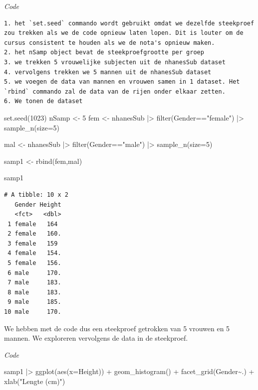 \documentclass[
  dutch,
  letterpaper,
  12pt]{book}
\newenvironment{Shaded}{\begin{snugshade}}{\end{snugshade}}
\newcommand{\AttributeTok}[1]{\textcolor[rgb]{0.40,0.45,0.13}{#1}}
\newcommand{\DecValTok}[1]{\textcolor[rgb]{0.68,0.00,0.00}{#1}}
\newcommand{\FunctionTok}[1]{\textcolor[rgb]{0.28,0.35,0.67}{#1}}
\newcommand{\NormalTok}[1]{\textcolor[rgb]{0.00,0.23,0.31}{#1}}
\newcommand{\OtherTok}[1]{\textcolor[rgb]{0.00,0.23,0.31}{#1}}
\newcommand{\SpecialCharTok}[1]{\textcolor[rgb]{0.37,0.37,0.37}{#1}}
\newcommand{\StringTok}[1]{\textcolor[rgb]{0.13,0.47,0.30}{#1}}
\theoremstyle{definition}
\theoremstyle{definition}
\theoremstyle{definition}
\theoremstyle{remark}
\begin{document}
\emph{Code}

\begin{verbatim}
1. het `set.seed` commando wordt gebruikt omdat we dezelfde steekproef zou trekken als we de code opnieuw laten lopen. Dit is louter om de cursus consistent te houden als we de nota's opnieuw maken.
2. het nSamp object bevat de steekproefgrootte per groep
3. we trekken 5 vrouwelijke subjecten uit de nhanesSub dataset
4. vervolgens trekken we 5 mannen uit de nhanesSub dataset
5. we voegen de data van mannen en vrouwen samen in 1 dataset. Het `rbind` commando zal de data van de rijen onder elkaar zetten.
6. We tonen de dataset
\end{verbatim}

\begin{Shaded}
\begin{Highlighting}[]
\FunctionTok{set.seed}\NormalTok{(}\DecValTok{1023}\NormalTok{)}
\NormalTok{nSamp }\OtherTok{\textless{}{-}} \DecValTok{5}
\NormalTok{fem }\OtherTok{\textless{}{-}}\NormalTok{ nhanesSub }\SpecialCharTok{|\textgreater{}}
  \FunctionTok{filter}\NormalTok{(Gender}\SpecialCharTok{==}\StringTok{"female"}\NormalTok{) }\SpecialCharTok{|\textgreater{}}
  \FunctionTok{sample\_n}\NormalTok{(}\AttributeTok{size=}\DecValTok{5}\NormalTok{)}

\NormalTok{mal }\OtherTok{\textless{}{-}}\NormalTok{ nhanesSub }\SpecialCharTok{|\textgreater{}}
  \FunctionTok{filter}\NormalTok{(Gender}\SpecialCharTok{==}\StringTok{"male"}\NormalTok{) }\SpecialCharTok{|\textgreater{}}
  \FunctionTok{sample\_n}\NormalTok{(}\AttributeTok{size=}\DecValTok{5}\NormalTok{)}

\NormalTok{samp1 }\OtherTok{\textless{}{-}} \FunctionTok{rbind}\NormalTok{(fem,mal)}

\NormalTok{samp1}
\end{Highlighting}
\end{Shaded}

\begin{verbatim}
# A tibble: 10 x 2
   Gender Height
   <fct>   <dbl>
 1 female   164 
 2 female   160.
 3 female   159 
 4 female   154.
 5 female   156.
 6 male     170.
 7 male     183.
 8 male     183.
 9 male     185.
10 male     170.
\end{verbatim}

We hebben met de code dus een steekproef getrokken van 5 vrouwen en 5
mannen. We exploreren vervolgens de data in de steekproef.

\emph{Code}

\begin{Shaded}
\begin{Highlighting}[]
\NormalTok{samp1 }\SpecialCharTok{|\textgreater{}}
  \FunctionTok{ggplot}\NormalTok{(}\FunctionTok{aes}\NormalTok{(}\AttributeTok{x=}\NormalTok{Height)) }\SpecialCharTok{+}
  \FunctionTok{geom\_histogram}\NormalTok{() }\SpecialCharTok{+}
  \FunctionTok{facet\_grid}\NormalTok{(Gender}\SpecialCharTok{\textasciitilde{}}\NormalTok{.) }\SpecialCharTok{+}
  \FunctionTok{xlab}\NormalTok{(}\StringTok{"Lengte (cm)"}\NormalTok{)}
\end{Highlighting}
\end{Shaded}
\end{document}
